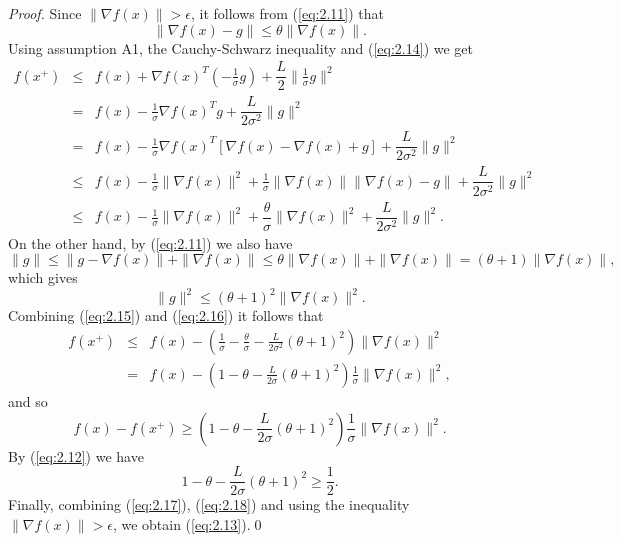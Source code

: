 \begin{proof}
Since $\|\nabla f(x)\|>\epsilon$, it follows from (\ref{eq:2.11}) that
\begin{equation}
\|\nabla f(x)-g\|\leq\theta\|\nabla f(x)\|.
\label{eq:2.14}
\end{equation}
Using assumption A1, the Cauchy-Schwarz inequality and (\ref{eq:2.14}) we get
\begin{eqnarray}
f(x^{+})&\leq & f(x)+\nabla f(x)^{T}\left(-\frac{1}{\sigma}g\right)+\dfrac{L}{2}\|\frac{1}{\sigma}g\|^{2}\nonumber\\
            & =   & f(x)-\frac{1}{\sigma}\nabla f(x)^{T}g+\dfrac{L}{2\sigma^{2}}\|g\|^{2}\nonumber\\
            &  =  & f(x)-\frac{1}{\sigma}\nabla f(x)^{T}\left[\nabla f(x)-\nabla f(x)+g\right]+\dfrac{L}{2\sigma^{2}}\|g\|^{2}\nonumber\\
            &\leq & f(x)-\frac{1}{\sigma}\|\nabla f(x)\|^{2}+\frac{1}{\sigma}\|\nabla f(x)\|\|\nabla f(x)-g\|+\dfrac{L}{2\sigma^{2}}\|g\|^{2}\nonumber\\
            &\leq & f(x)-\frac{1}{\sigma}\|\nabla f(x)\|^{2}+\dfrac{\theta}{\sigma}\|\nabla f(x)\|^{2}+\dfrac{L}{2\sigma^{2}}\|g\|^{2}.
\label{eq:2.15}
\end{eqnarray}
On the other hand, by (\ref{eq:2.11}) we also have
\begin{equation*}
\|g\|\leq \|g-\nabla f(x)\|+\|\nabla f(x)\|\leq\theta\|\nabla f(x)\|+\|\nabla f(x)\|=(\theta+1)\|\nabla f(x)\|,
\end{equation*}
which gives
\begin{equation}
\|g\|^{2}\leq (\theta +1)^{2}\|\nabla f(x)\|^{2}.
\label{eq:2.16}
\end{equation}
Combining (\ref{eq:2.15}) and (\ref{eq:2.16}) it follows that
\begin{eqnarray*}
f(x^{+})&\leq & f(x)-\left(\frac{1}{\sigma}-\frac{\theta}{\sigma}-\frac{L}{2\sigma^{2}}(\theta+1)^{2}\right)\|\nabla f(x)\|^{2}\\
            & =   &f(x)-\left(1-\theta-\frac{L}{2\sigma}(\theta+1)^{2}\right)\frac{1}{\sigma}\|\nabla f(x)\|^{2},
\end{eqnarray*}
and so
\begin{equation}
f(x)-f(x^{+})\geq \left(1-\theta-\frac{L}{2\sigma}(\theta+1)^{2}\right)\frac{1}{\sigma}\|\nabla f(x)\|^{2}.
\label{eq:2.17}
\end{equation}
By (\ref{eq:2.12}) we have
\begin{equation}
1-\theta-\frac{L}{2\sigma}(\theta+1)^{2}\geq\dfrac{1}{2}.
\label{eq:2.18}
\end{equation}
Finally, combining (\ref{eq:2.17}), (\ref{eq:2.18}) and using the inequality $\|\nabla f(x)\|>\epsilon$, we obtain (\ref{eq:2.13}).\qed
\end{proof}

